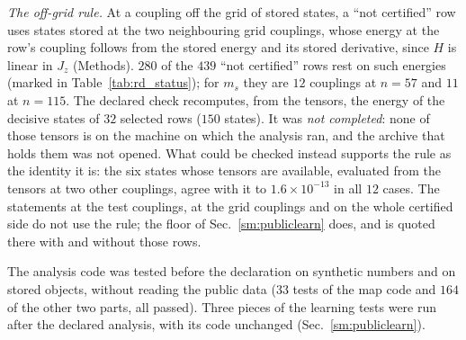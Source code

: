 \documentclass[aps,prx,onecolumn,10pt,nofootinbib,longbibliography,floatfix]{revtex4-2}
\theoremstyle{remark}
\newcommand{\Jz}{J_z}
\newcommand{\ms}{m_s}
\begin{document}
\emph{The off-grid rule.} At a coupling off the grid of stored states, a ``not certified'' row uses states stored at
the two neighbouring grid couplings, whose energy at the row's coupling follows from the stored energy and its stored
derivative, since $H$ is linear in $\Jz$ (Methods). $280$ of the $439$ ``not certified'' rows rest on such energies %
(marked in Table~\ref{tab:rd_status}); for $\ms$ they are $12$ couplings at $n=57$ and $11$ at $n=115$. The declared %
check recomputes, from the tensors, the energy of the decisive states of $32$ selected rows ($150$ states). It was %
\emph{not completed}: none of those tensors is on the machine on which the analysis ran, and the archive that holds
them was not opened. What could be checked instead supports the rule as the identity it is: the six states whose
tensors are available, evaluated from the tensors at two other couplings, agree with it to $1.6\times10^{-13}$ in %
all $12$ cases. The statements at the test couplings, at the grid couplings and on the whole certified side do not %
use the rule; the floor of Sec.~\ref{sm:publiclearn} does, and is quoted there with and without those rows.

The analysis code was tested before the declaration on synthetic numbers and on stored objects, without reading the
public data ($33$ tests of the map code and $164$ of the other two parts, all passed). Three pieces of the learning %
tests were run after the declared analysis, with its code unchanged (Sec.~\ref{sm:publiclearn}).

\def\SMcap{Checks of the analysis of the public data, as fixed in its declaration. $^{a}$: completed after the %
analyses ran. $^{b}$: see the text; the rule is an identity and agrees to $1.6\times10^{-13}$ with the six states whose %
tensors are available.}\def\SMlab{tab:rd_checks}

\end{document}
